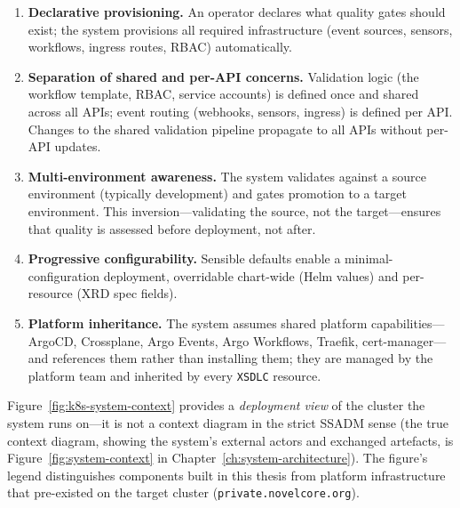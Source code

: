 \begin{enumerate}
    \item \textbf{Declarative provisioning.} An operator declares what quality gates should exist; the system provisions all required infrastructure (event sources, sensors, workflows, ingress routes, RBAC) automatically.

    \item \textbf{Separation of shared and per-API concerns.} Validation logic (the workflow template, RBAC, service accounts) is defined once and shared across all APIs; event routing (webhooks, sensors, ingress) is defined per API. Changes to the shared validation pipeline propagate to all APIs without per-API updates.

    \item \textbf{Multi-environment awareness.} The system validates against a source environment (typically development) and gates promotion to a target environment. This inversion---validating the source, not the target---ensures that quality is assessed before deployment, not after.

    \item \textbf{Progressive configurability.} Sensible defaults enable a minimal-configuration deployment, overridable chart-wide (Helm values) and per-resource (XRD spec fields).

    \item \textbf{Platform inheritance.} The system assumes shared platform capabilities---ArgoCD, Crossplane, Argo Events, Argo Workflows, Traefik, cert-manager---and references them rather than installing them; they are managed by the platform team and inherited by every \texttt{XSDLC} resource.
\end{enumerate}

Figure~\ref{fig:k8s-system-context} provides a \emph{deployment view} of the cluster the system runs on---it is not a context diagram in the strict SSADM sense (the true context diagram, showing the system's external actors and exchanged artefacts, is Figure~\ref{fig:system-context} in Chapter~\ref{ch:system-architecture}). The figure's legend distinguishes components built in this thesis from platform infrastructure that pre-existed on the target cluster (\texttt{private.novelcore.org}).

